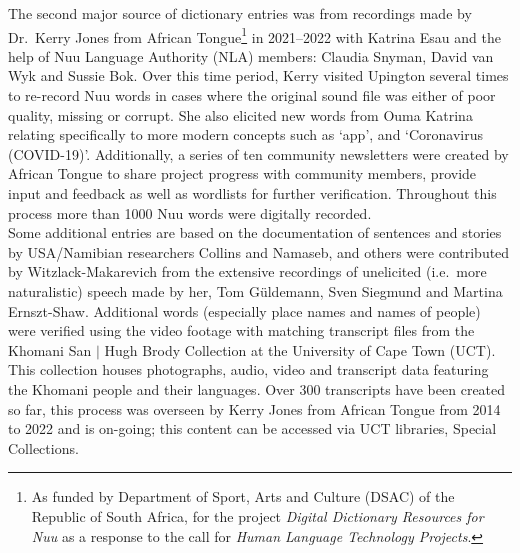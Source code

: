 The second major source of dictionary entries was from recordings made
by Dr.\ Kerry Jones from African Tongue\footnote{As funded by
Department of Sport, Arts and Culture (DSAC) of the Republic of South
Africa, for the project \emph{Digital Dictionary Resources for
N\textipa{\textvertline}uu} as a response to the call for \emph{Human
Language Technology Projects}.} in 2021--2022 with Katrina Esau and
the help of N\textipa{\textvertline}uu Language Authority (NLA)
members: Claudia Snyman, David van Wyk and Sussie Bok. Over this time
period, Kerry visited Upington several times to re-record
N\textipa{\textvertline}uu words in cases where the original sound
file was either of poor quality, missing or corrupt. She also elicited
new words from Ouma Katrina relating specifically to more modern
concepts such as `app', and `Coronavirus (COVID-19)'. Additionally, a
series of ten community newsletters were created by African Tongue to
share project progress with community members, provide input and
feedback as well as wordlists for further verification. Throughout
this process more than 1000 N\textipa{\textvertline}uu words were
digitally recorded.\\

Some additional entries are based on the documentation of sentences
and stories by USA/Namibian researchers Collins and Namaseb,
and others were contributed by Witzlack-Makarevich from the
extensive recordings of unelicited (i.e.\ more naturalistic) speech
made by her, Tom G\"{u}ldemann, Sven Siegmund and Martina Ernszt-Shaw.
Additional words (especially place names and names of people) were
verified using the video footage with matching transcript files from
the \textipa{\textdoublebarpipe}Khomani San $|$ Hugh Brody Collection
at the University of Cape Town (UCT). This collection houses
photographs, audio, video and transcript data featuring the
\textipa{\textdoublebarpipe}Khomani people and their languages. Over
300 transcripts have been created so far, this process was overseen by
Kerry Jones from African Tongue from 2014 to 2022 and is on-going;
this content can be accessed via UCT libraries, Special Collections.\\

